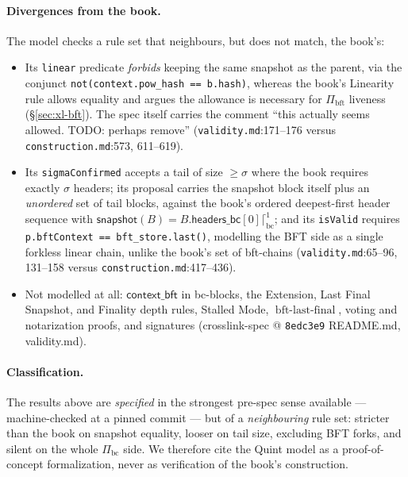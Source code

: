 \documentclass[11pt,a4paper]{article}
\theoremstyle{definition}
\begin{document}
\paragraph{Divergences from the book.} The model checks a rule set that
neighbours, but does not match, the book's:
\begin{itemize}
\item Its \texttt{linear} predicate \emph{forbids} keeping the same
  snapshot as the parent, via the conjunct
  \texttt{not(context.pow\_hash == b.hash)},
  whereas the book's Linearity rule allows equality and argues the
  allowance is necessary for $\Pi_{\mathrm{bft}}$ liveness
  (\S\ref{sec:xl-bft}). The spec itself carries the comment ``this
  actually seems allowed. TODO: perhaps remove''
  (\texttt{validity.md}:171--176 versus
  \texttt{construction.md}:573, 611--619).
\item Its \texttt{sigmaConfirmed} accepts a tail of size $\ge \sigma$
  where the book requires exactly $\sigma$ headers; its proposal carries
  the snapshot block itself plus an \emph{unordered} set of tail blocks,
  against the book's ordered deepest-first header sequence with
  $\mathsf{snapshot}(B) = B.\mathsf{headers\_bc}[0]
  \lceil^{1}_{\mathrm{bc}}$; and its \texttt{isValid} requires
  \texttt{p.bftContext == bft\_store.last()}, modelling the BFT side as a
  single forkless linear chain, unlike the book's set of bft-chains
  (\texttt{validity.md}:65--96, 131--158 versus
  \texttt{construction.md}:417--436).
\item Not modelled at all: $\mathsf{context\_bft}$ in bc-blocks, the
  Extension, Last Final Snapshot, and Finality depth rules, Stalled Mode,
  $\operatorname{bft\text{-}last\text{-}final}$, voting and notarization
  proofs, and signatures (crosslink-spec @ \texttt{8edc3e9} README.md,
  validity.md).
\end{itemize}

\paragraph{Classification.} The results above are \emph{specified} in
the strongest pre-spec sense available --- machine-checked at a pinned
commit --- but of a \emph{neighbouring} rule set: stricter than the book
on snapshot equality, looser on tail size, excluding BFT forks, and silent on
the whole $\Pi_{\mathrm{bc}}$ side. We therefore cite the Quint model as
a proof-of-concept formalization, never as verification of the book's
construction.
\end{document}
